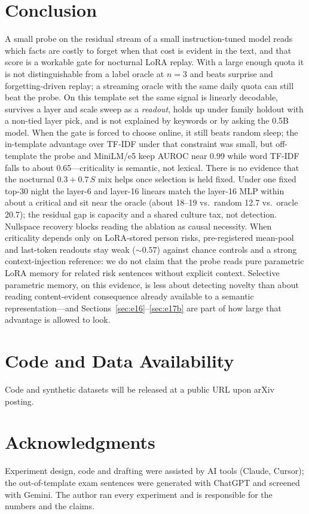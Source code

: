 \documentclass[11pt,a4paper]{article}
\begin{document}
\section{Conclusion}

A small probe on the residual stream of a small instruction-tuned model reads which facts are costly to forget when that cost is evident in the text, and that score is a workable gate for nocturnal LoRA replay.
With a large enough quota it is not distinguishable from a label oracle at $n{=}3$ and beats surprise and forgetting-driven replay; a streaming oracle with the same daily quota can still beat the probe.
On this template set the same signal is linearly decodable, survives a layer and scale sweep as a \emph{readout}, holds up under family holdout with a non-tied layer pick, and is not explained by keywords or by asking the 0.5B model.
When the gate is forced to choose online, it still beats random sleep; the in-template advantage over TF-IDF under that constraint was small, but off-template the probe and MiniLM/e5 keep AUROC near 0.99 while word TF-IDF falls to about 0.65---criticality is semantic, not lexical.
There is no evidence that the nocturnal $0.3{+}0.7\,S$ mix helps once selection is held fixed.
Under one fixed top-30 night the layer-6 and layer-16 linears match the layer-16 MLP within about a critical and sit near the oracle (about 18--19 vs.\ random 12.7 vs.\ oracle 20.7); the residual gap is capacity and a shared culture tax, not detection.
Nullspace recovery blocks reading the ablation as causal necessity.
When criticality depends only on LoRA-stored person risks, pre-registered mean-pool and last-token readouts stay weak (${\sim}0.57$) against chance controls and a strong context-injection reference: we do not claim that the probe reads pure parametric LoRA memory for related risk sentences without explicit context.
Selective parametric memory, on this evidence, is less about detecting novelty than about reading content-evident consequence already available to a semantic representation---and Sections~\ref{sec:e16}--\ref{sec:e17b} are part of how large that advantage is allowed to look.

\section*{Code and Data Availability}
Code and synthetic datasets will be released at a public URL upon arXiv posting.

\section*{Acknowledgments}
Experiment design, code and drafting were assisted by AI tools (Claude, Cursor); the out-of-template exam sentences were generated with ChatGPT and screened with Gemini. The author ran every experiment and is responsible for the numbers and the claims.
\end{document}
